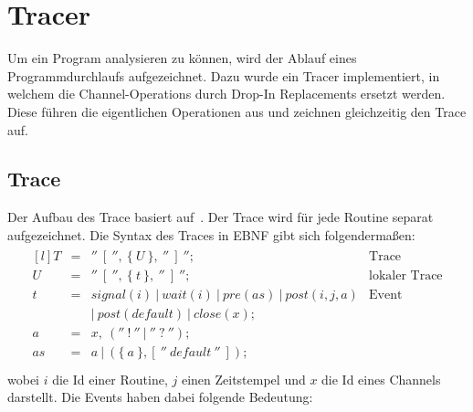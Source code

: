 \chapter{Tracer}
Um ein Program analysieren zu können, wird der Ablauf eines Programmdurchlaufs
aufgezeichnet. Dazu wurde ein Tracer implementiert, in welchem die 
Channel-Operations durch Drop-In Replacements ersetzt werden. Diese 
führen die eigentlichen Operationen aus und zeichnen gleichzeitig den 
Trace auf.


\section{Trace}
Der Aufbau des Trace basiert auf~\cite{PPDP18}. Der Trace wird für jede Routine
separat aufgezeichnet. Die Syntax des Traces in EBNF gibt sich 
folgendermaßen:
\begin{align*}
  \begin{matrix*}[l]
    T & = & ''\ [\ '',\ \{\ U\ \},\ ''\ ]\ ''; & \text{Trace}\\
    U & = & ''\ [\ '',\ \{\ t\ \},\ ''\ ]\ ''; & \text{lokaler Trace} \\
    t & = & signal(i)\ |\ wait(i)\ |\ pre(as)\ |\ post(i, j, a) & \text{Event}\\
      &   & |\ post(default)\ |\ close(x); & \\
    a & = & x,\ (''\ !\ ''\ |\ ''\ ?\ ''); & \\
    as & = & a\ |\ (\{\ a\ \}, [\ ''\ default\ ''\ ]); & \\
  \end{matrix*}
\end{align*}
wobei $i$ die Id einer Routine, $j$ einen Zeitstempel und $x$ die Id eines 
Channels darstellt. Die Events haben dabei folgende Bedeutung:
